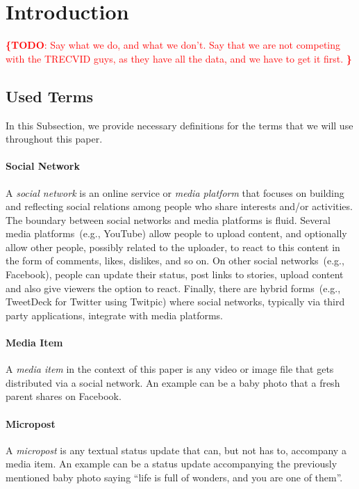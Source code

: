 \documentclass{acm_proc_article-sp}
\let\oldemph\emph
\renewcommand{\emph}[1]{\oldemph{\fontsize{9}{9}\selectfont #1}}
\newcommand{\todo}[1]{\noindent\textcolor{red}{{\bf \{TODO}: #1{\bf \}}}}
\begin{document}
\keywords{\todo{Keywords}}

\section{Introduction} \label{sec:introduction}
\todo{
Say what we do, and what we don't.
Say that we are not competing with the TRECVID guys, as they have all the data, and we have to get it first.
}

\subsection{Used Terms}
In this Subsection, we provide necessary definitions for the terms that we will use throughout this paper.

\paragraph{Social Network}
A \emph{social network} is an online service or \emph{media platform} that focuses on building and reflecting social relations among people who share interests and/or activities.
The boundary between social networks and media platforms is fluid.
Several media platforms~(e.g., YouTube) allow people to upload content,
and optionally allow other people, possibly related to the uploader,
to react to this content in the form of comments, likes, dislikes, and so on.
On other social networks~(e.g., Facebook), people can update their status, post links to stories,
upload content and also give viewers the option to react.
Finally, there are hybrid forms~(e.g., TweetDeck for Twitter using Twitpic) where social networks,
typically via third party applications,
integrate with media platforms.

\paragraph{Media Item}
A \emph{media item} in the context of this paper is any video or image file that gets distributed via a social network.
An example can be a baby photo that a fresh parent shares on Facebook. 

\paragraph{Micropost}
A \emph{micropost} is any textual status update that can,
but not has to,
accompany a media item.
An example can be a status update accompanying the previously mentioned baby photo saying ``life is full of wonders, and you are one of them''.
\end{document}
